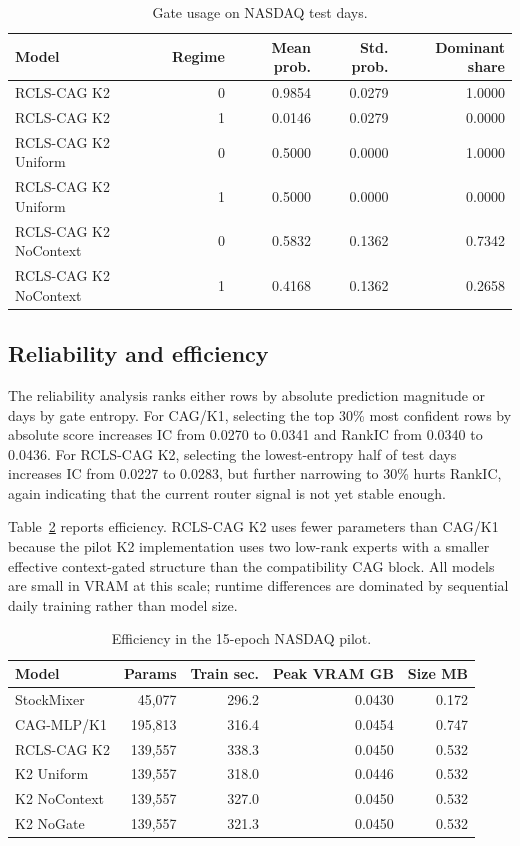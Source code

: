 \documentclass{article}
\begin{document}
\begin{table}[t]
\centering
\caption{Gate usage on NASDAQ test days.}
\label{tab:gate}
\begin{tabular}{lrrrr}
\toprule
Model & Regime & Mean prob. & Std. prob. & Dominant share \\
\midrule
RCLS-CAG K2 & 0 & 0.9854 & 0.0279 & 1.0000 \\
RCLS-CAG K2 & 1 & 0.0146 & 0.0279 & 0.0000 \\
RCLS-CAG K2 Uniform & 0 & 0.5000 & 0.0000 & 1.0000 \\
RCLS-CAG K2 Uniform & 1 & 0.5000 & 0.0000 & 0.0000 \\
RCLS-CAG K2 NoContext & 0 & 0.5832 & 0.1362 & 0.7342 \\
RCLS-CAG K2 NoContext & 1 & 0.4168 & 0.1362 & 0.2658 \\
\bottomrule
\end{tabular}
\end{table}

\subsection{Reliability and efficiency}

The reliability analysis ranks either rows by absolute prediction magnitude or days by gate entropy. For CAG/K1, selecting the top 30\% most confident rows by absolute score increases IC from 0.0270 to 0.0341 and RankIC from 0.0340 to 0.0436. For RCLS-CAG K2, selecting the lowest-entropy half of test days increases IC from 0.0227 to 0.0283, but further narrowing to 30\% hurts RankIC, again indicating that the current router signal is not yet stable enough.

Table~\ref{tab:eff} reports efficiency. RCLS-CAG K2 uses fewer parameters than CAG/K1 because the pilot K2 implementation uses two low-rank experts with a smaller effective context-gated structure than the compatibility CAG block. All models are small in VRAM at this scale; runtime differences are dominated by sequential daily training rather than model size.

\begin{table}[t]
\centering
\caption{Efficiency in the 15-epoch NASDAQ pilot.}
\label{tab:eff}
\begin{tabular}{lrrrr}
\toprule
Model & Params & Train sec. & Peak VRAM GB & Size MB \\
\midrule
StockMixer & 45,077 & 296.2 & 0.0430 & 0.172 \\
CAG-MLP/K1 & 195,813 & 316.4 & 0.0454 & 0.747 \\
RCLS-CAG K2 & 139,557 & 338.3 & 0.0450 & 0.532 \\
K2 Uniform & 139,557 & 318.0 & 0.0446 & 0.532 \\
K2 NoContext & 139,557 & 327.0 & 0.0450 & 0.532 \\
K2 NoGate & 139,557 & 321.3 & 0.0450 & 0.532 \\
\bottomrule
\end{tabular}
\end{table}
\end{document}
